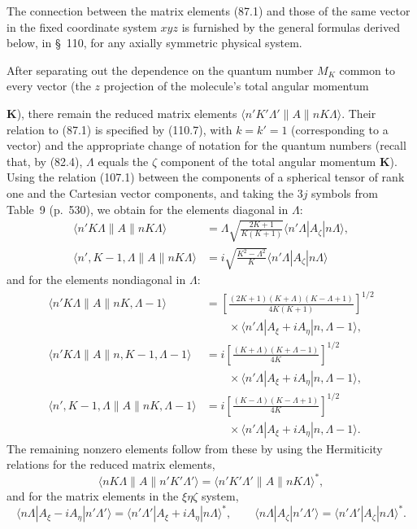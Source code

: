The connection between the matrix elements (87.1) and those of the same vector in the fixed coordinate system $xyz$ is furnished by the general formulas derived below, in \S~110, for any axially symmetric physical system.

After separating out the dependence on the quantum number $M_K$ common to every vector (the $z$ projection of the molecule's total angular momentum

$\mathbf K$), there remain the reduced matrix elements $\langle n'K'\Lambda'\|A\|nK\Lambda\rangle$. Their relation to (87.1) is specified by (110.7), with $k=k'=1$ (corresponding to a vector) and the appropriate change of notation for the quantum numbers (recall that, by (82.4), $\Lambda$ equals the $\zeta$ component of the total angular momentum $\mathbf K$). Using the relation (107.1) between the components of a spherical tensor of rank one and the Cartesian vector components, and taking the $3j$ symbols from Table~9 (p.~530), we obtain for the elements diagonal in $\Lambda$:
\begin{equation}
\begin{split}
\langle n'K\Lambda\|A\|nK\Lambda\rangle&=\Lambda\sqrt{\frac{2K+1}{K(K+1)}}\langle n'\Lambda|A_\zeta|n\Lambda\rangle,\\
\langle n',K-1,\Lambda\|A\|nK\Lambda\rangle&=i\sqrt{\frac{K^2-\Lambda^2}{K}}\langle n'\Lambda|A_\zeta|n\Lambda\rangle
\end{split}
\tag{87.2}
\end{equation}
and for the elements nondiagonal in $\Lambda$:
\begin{equation}
\begin{split}
\langle n'K\Lambda\|A\|nK,\Lambda-1\rangle
&=\left[\frac{(2K+1)(K+\Lambda)(K-\Lambda+1)}{4K(K+1)}\right]^{1/2}\\[-2pt]
&\qquad\times\langle n'\Lambda|A_\xi+iA_\eta|n,\Lambda-1\rangle,\\
\langle n'K\Lambda\|A\|n,K-1,\Lambda-1\rangle
&=i\left[\frac{(K+\Lambda)(K+\Lambda-1)}{4K}\right]^{1/2}\\[-2pt]
&\qquad\times\langle n'\Lambda|A_\xi+iA_\eta|n,\Lambda-1\rangle,\\
\langle n',K-1,\Lambda\|A\|nK,\Lambda-1\rangle
&=i\left[\frac{(K-\Lambda)(K-\Lambda+1)}{4K}\right]^{1/2}\\[-2pt]
&\qquad\times\langle n'\Lambda|A_\xi+iA_\eta|n,\Lambda-1\rangle.
\end{split}
\tag{87.3}
\end{equation}
The remaining nonzero elements follow from these by using the Hermiticity relations for the reduced matrix elements,
\[
\langle nK\Lambda\|A\|n'K'\Lambda'\rangle=\langle n'K'\Lambda'\|A\|nK\Lambda\rangle^*,
\]
and for the matrix elements in the $\xi\eta\zeta$ system,
\[
\langle n\Lambda|A_\xi-iA_\eta|n'\Lambda'\rangle=\langle n'\Lambda'|A_\xi+iA_\eta|n\Lambda\rangle^*,\qquad
\langle n\Lambda|A_\zeta|n'\Lambda'\rangle=\langle n'\Lambda'|A_\zeta|n\Lambda\rangle^*.
\]

